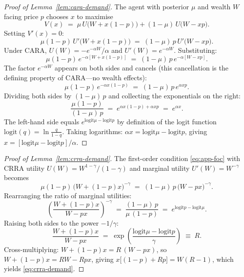 \documentclass[12pt,letterpaper]{article}
\theoremstyle{definition}
\theoremstyle{remark}
\newcommand{\logit}{\mathrm{logit}}
\newcommand{\1}{\mathbf{1}}
\begin{document}
\begin{proof}[Proof of Lemma~\ref{lem:cara-demand}]
The agent with posterior $\mu$ and wealth $W$ facing price $p$ chooses
$x$ to maximise
\[
   V(x) \;=\; \mu\,U\bigl(W+x(1-p)\bigr) + (1-\mu)\,U\bigl(W-xp\bigr).
\]
Setting $V'(x)=0$:
\begin{equation}
   \mu(1-p)\,U'\bigl(W+x(1-p)\bigr) \;=\; (1-\mu)\,p\,U'\bigl(W-xp\bigr).
\label{eq:app-foc}
\end{equation}
Under CARA, $U(W)=-e^{-\alpha W}/\alpha$ and $U'(W)=e^{-\alpha W}$.
Substituting:
\[
   \mu(1-p)\,e^{-\alpha[W+x(1-p)]} \;=\; (1-\mu)\,p\,e^{-\alpha[W-xp]}.
\]
The factor $e^{-\alpha W}$ appears on both sides and cancels (this
cancellation is the defining property of CARA---no wealth effects):
\[
   \mu(1-p)\,e^{-\alpha x(1-p)} \;=\; (1-\mu)\,p\,e^{\alpha xp}.
\]
Dividing both sides by $(1-\mu)\,p$ and collecting the exponentials on the
right:
\[
   \frac{\mu(1-p)}{(1-\mu)\,p}
   \;=\; e^{\alpha x(1-p)+\alpha xp}
   \;=\; e^{\alpha x}.
\]
The left-hand side equals $e^{\logit\mu-\logit p}$ by definition of the
logit function $\logit(q)=\ln\tfrac{q}{1-q}$. Taking logarithms:
$\alpha x = \logit\mu-\logit p$, giving
$x = [\logit\mu-\logit p]/\alpha$.
\end{proof}

\begin{proof}[Proof of Lemma~\ref{lem:crra-demand}]
The first-order condition \eqref{eq:app-foc} with CRRA utility
$U(W)=W^{1-\gamma}/(1-\gamma)$ and marginal utility $U'(W)=W^{-\gamma}$
becomes
\[
   \mu(1-p)\,\bigl(W+(1-p)x\bigr)^{-\gamma}
   \;=\; (1-\mu)\,p\,\bigl(W-px\bigr)^{-\gamma}.
\]
Rearranging the ratio of marginal utilities:
\[
   \left(\frac{W+(1-p)x}{W-px}\right)^{-\gamma}
   \;=\; \frac{(1-\mu)\,p}{\mu\,(1-p)}
   \;=\; e^{\logit p - \logit\mu}.
\]
Raising both sides to the power $-1/\gamma$:
\[
   \frac{W+(1-p)x}{W-px}
   \;=\; \exp\!\left(\frac{\logit\mu-\logit p}{\gamma}\right) \;\equiv\; R.
\]
Cross-multiplying: $W+(1-p)x = R\,(W-px)$, so
$W + (1-p)x = RW - Rpx$, giving
$x\bigl[(1-p)+Rp\bigr] = W(R-1)$, which yields
\eqref{eq:crra-demand}.
\end{proof}
\end{document}
